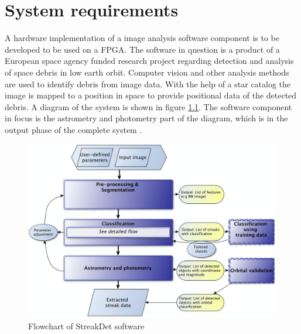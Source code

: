 \documentclass[12pt]{report}
\begin{document}

\chapter{System requirements}

A hardware implementation of a image analysis software component is to be developed to be used on a FPGA. The software in question is a product of a European space agency funded research project regarding detection and analysis of space debris in low earth orbit. Computer vision and other analysis methods are used to identify debris from image data. With the help of a star catalog the image is mapped to a position in space to provide positional data of the detected debris. A diagram of the system is shown in figure \ref{fig:0}. The software component in focus is the astrometry and photometry part of the diagram, which is in the output phase of the complete system \citep{StreakDet} \citep{Starmatch}.

\begin{figure}[h]
    \centering
    \includegraphics[scale=0.2]{figures/streakdet.png}
    \caption{Flowchart of StreakDet software \citep{StreakDet}}
    \label{fig:0}
\end{figure}
\end{document}
